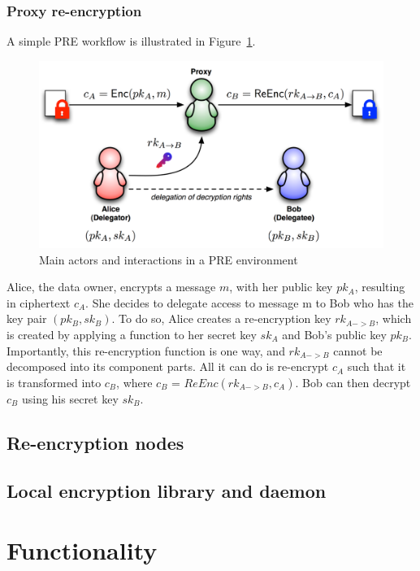 \documentclass[notitlepage,longbibliography]{revtex4-1}
\begin{document}
\subsubsection{Proxy re-encryption}
A simple PRE workflow is illustrated in Figure~\ref{fig-pre}.

\begin{figure}
\centering
\includegraphics[width=\columnwidth]{pre.png}
\caption{Main actors and interactions in a PRE environment}\label{fig-pre}
\end{figure}

Alice, the data owner, encrypts a message $m$, with her public key $pk_{A}$, resulting in ciphertext $c_{A}$.
She decides to delegate access to message m to Bob who has the key pair $(pk_{B}, sk_{B})$.
To do so, Alice creates a re-encryption key $rk_{A->B}$, which is created by applying a function to her secret key $sk_{A}$ and
Bob’s public key $pk_{B}$.
Importantly, this re-encryption function is one way, and $rk_{A->B}$ cannot be decomposed into its component parts.
All it can do is re-encrypt $c_{A}$ such that it is transformed into $c_{B}$, where $c_{B}$ = $ReEnc(rk_{A->B}, c_{A})$.
Bob can then decrypt $c_{B}$ using his secret key $sk_{B}$.

\subsection{Re-encryption nodes}

\subsection{Local encryption library and daemon}

\section{Functionality}
\end{document}
